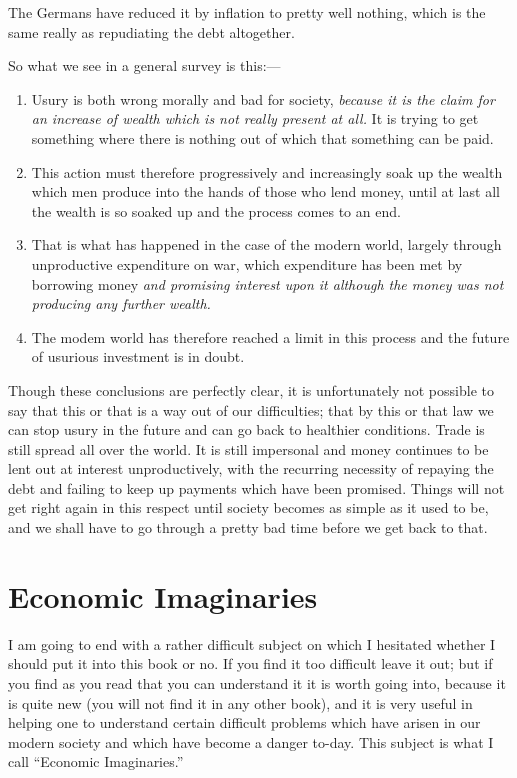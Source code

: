 \documentclass{book}
\begin{document}
The Germans have reduced it by inflation to pretty well nothing, which is the same really as repudiating the debt altogether.

So what we see in a general survey is this:—

\begin{enumerate}
	\item Usury is both wrong morally and bad for society, \emph{because it is the claim for an increase of wealth which is not really present at all.} It is trying to get something where there is nothing out of which that something can be paid.


	\item This action must therefore progressively and increasingly soak up the wealth which men produce into the hands of those who lend money, until at last all the wealth is so soaked up and the process comes to an end.


	\item That is what has happened in the case of the modern world, largely through unproductive expenditure on war, which expenditure has been met by borrowing money \emph{and promising interest upon it although the money was not producing any further wealth.}


	\item The modem world has therefore reached a limit in this process and the future of usurious investment is in doubt.



\end{enumerate}
Though these conclusions are perfectly clear, it is unfortunately not possible to say that this or that is a way out of our difficulties; that by this or that law we can stop usury in the future and can go back to healthier conditions. Trade is still spread all over the world. It is still impersonal and money continues to be lent out at interest unproductively, with the recurring necessity of repaying the debt and failing to keep up payments which have been promised. Things will not get right again in this respect until society becomes as simple as it used to be, and we shall have to go through a pretty bad time before we get back to that.

\chapter*{Economic Imaginaries}
\label{chapter-21}
I am going to end with a rather difficult subject on which I hesitated whether I should put it into this book or no. If you find it too difficult leave it out; but if you find as you read that you can understand it it is worth going into, because it is quite new (you will not find it in any other book), and it is very useful in helping one to understand certain difficult problems which have arisen in our modern society and which have become a danger to-day. This subject is what I call “Economic Imaginaries.”
\end{document}
